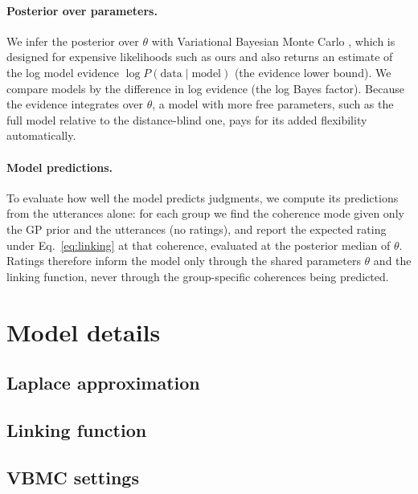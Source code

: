 \paragraph{Posterior over parameters.} We infer the posterior over $\theta$
with Variational Bayesian Monte Carlo \citep[VBMC;][]{acerbi2018vbmc},
which is designed for expensive likelihoods such as ours and also returns an
estimate of the log model evidence $\log P(\text{data} \mid \text{model})$
(the evidence lower bound). We compare models by the difference in log evidence
(the log Bayes factor). Because the evidence integrates over $\theta$, a model
with more free parameters, such as the full model relative to the
distance-blind one, pays for its added flexibility automatically.

\paragraph{Model predictions.} To evaluate how well the model predicts
judgments, we compute its predictions from the utterances alone: for each group
we find the coherence mode given only the GP prior and the utterances
(no ratings), and report the expected rating under Eq.~\ref{eq:linking} at that
coherence, evaluated at the posterior median of $\theta$. Ratings therefore
inform the model only through the shared parameters $\theta$ and the linking
function, never through the group-specific coherences being predicted.

\appendix
\section{Model details}

\subsection{Laplace approximation}

\subsection{Linking function}
\label{app:linking}

\subsection{VBMC settings}
